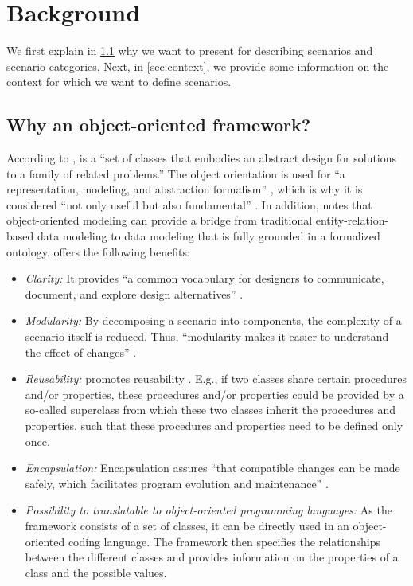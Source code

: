 \section{Background}
\label{sec:background}

We first explain in \cref{sec:why oo framework} why we want to present \cstartc {} \cendc for describing scenarios and  scenario categories. Next, in \cref{sec:context}, we provide some information on the context for which we want to define scenarios. 


\cstartb
\subsection{Why an  object-oriented framework?}
\label{sec:why oo framework}

According to \textcite{johnson1988designing},  is a ``set of classes that embodies an abstract design for solutions to a family of related problems.''
The object orientation is used for ``a representation, modeling, and abstraction formalism'' \autocite{wegner1990concepts}, which is why it is considered ``not only useful but also fundamental'' \autocite{wegner1990concepts}. \cendb
\cstartd In addition, \textcite{patridge2005business} notes that object-oriented modeling can provide a bridge from traditional entity-relation-based data modeling to data modeling that is fully grounded in a formalized ontology. \cendd
\cstartb {} offers the following benefits:
\begin{itemize}
	\item \cendb\cstartc\emph{Clarity:} \cendc\cstartb It provides ``a common vocabulary for designers to communicate, document, and explore design alternatives'' \autocite{gamma1993design}.
	\item \cendb\cstartc\emph{Modularity:} By decomposing a scenario into components, the complexity of a scenario itself is reduced. Thus, ``modularity makes it easier to understand the effect of changes'' \cite{johnson1988designing}.
	\item \emph{Reusability:} \cendc\cstartb {} promotes reusability \autocite{snyder1986encapsulation, meyer1987reusability, johnson1988designing}. E.g., if two classes share certain procedures and/or properties, these procedures and/or properties could be provided by a so-called superclass from which these two classes inherit the procedures and properties, such that these procedures and properties need to be defined only once.
	\item \cendb\cstartc\emph{Encapsulation:} \cendc\cstartb Encapsulation assures ``that compatible changes can be made safely, which facilitates program evolution and maintenance'' \autocite{snyder1986encapsulation}.
	\item \cendb\cstartc\emph{Possibility to translatable to object-oriented programming languages:} \cendc\cstartb As the framework consists of a set of classes, it can be directly used in an object-oriented coding language. The framework then specifies the relationships between the different classes and provides information on the properties of a class and the possible values.
\end{itemize}
